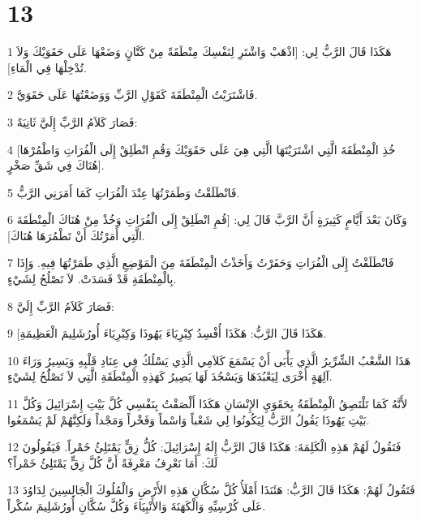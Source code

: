 \chapter{13}

\par 1 هَكَذَا قَالَ الرَّبُّ لِي: [اذْهَبْ وَاشْتَرِ لِنَفْسِكَ مِنْطَقَةً مِنْ كَتَّانٍ وَضَعْهَا عَلَى حَقَوَيْكَ وَلاَ تُدْخِلْهَا فِي الْمَاءِ].
\par 2 فَاشْتَرَيْتُ الْمِنْطَقَةَ كَقَوْلِ الرَّبِّ وَوَضَعْتُهَا عَلَى حَقَوَيَّ.
\par 3 فَصَارَ كَلاَمُ الرَّبِّ إِلَيَّ ثَانِيَةً:
\par 4 [خُذِ الْمِنْطَقَةَ الَّتِي اشْتَرَيْتَهَا الَّتِي هِيَ عَلَى حَقَوَيْكَ وَقُمِ انْطَلِقْ إِلَى الْفُرَاتِ وَاطْمُرْهَا هُنَاكَ فِي شَقِّ صَخْرٍ].
\par 5 فَانْطَلَقْتُ وَطَمَرْتُهَا عِنْدَ الْفُرَاتِ كَمَا أَمَرَنِي الرَّبُّ.
\par 6 وَكَانَ بَعْدَ أَيَّامٍ كَثِيرَةٍ أَنَّ الرَّبَّ قَالَ لِي: [قُمِ انْطَلِقْ إِلَى الْفُرَاتِ وَخُذْ مِنْ هُنَاكَ الْمِنْطَقَةَ الَّتِي أَمَرْتُكَ أَنْ تَطْمُرَهَا هُنَاكَ].
\par 7 فَانْطَلَقْتُ إِلَى الْفُرَاتِ وَحَفَرْتُ وَأَخَذْتُ الْمِنْطَقَةَ مِنَ الْمَوْضِعِ الَّذِي طَمَرْتُهَا فِيهِ. وَإِذَا بِالْمِنْطَقَةِ قَدْ فَسَدَتْ. لاَ تَصْلُحُ لِشَيْءٍ.
\par 8 فَصَارَ كَلاَمُ الرَّبِّ إِلَيَّ:
\par 9 [هَكَذَا قَالَ الرَّبُّ: هَكَذَا أُفْسِدُ كِبْرِيَاءَ يَهُوذَا وَكِبْرِيَاءَ أُورُشَلِيمَ الْعَظِيمَةِ.
\par 10 هَذَا الشَّعْبُ الشِّرِّيرُ الَّذِي يَأْبَى أَنْ يَسْمَعَ كَلاَمِي الَّذِي يَسْلُكُ فِي عِنَادِ قَلْبِهِ وَيَسِيرُ وَرَاءَ آلِهَةٍ أُخْرَى لِيَعْبُدَهَا وَيَسْجُدَ لَهَا يَصِيرُ كَهَذِهِ الْمِنْطَقَةِ الَّتِي لاَ تَصْلَُحُ لِشَيْءٍ.
\par 11 لأَنَّهُ كَمَا تَلْتَصِقُ الْمِنْطَقَةُ بِحَقَوَيِ الإِنْسَانِ هَكَذَا أَلْصَقْتُ بِنَفْسِي كُلَّ بَيْتِ إِسْرَائِيلَ وَكُلَّ بَيْتِ يَهُوذَا يَقُولُ الرَّبُّ لِيَكُونُوا لِي شَعْباً وَاسْماً وَفَخْراً وَمَجْداً وَلَكِنَّهُمْ لَمْ يَسْمَعُوا.
\par 12 فَتَقُولُ لَهُمْ هَذِهِ الْكَلِمَةَ: هَكَذَا قَالَ الرَّبُّ إِلَهُ إِسْرَائِيلَ: كُلُّ زِقٍّ يَمْتَلِئُ خَمْراً. فَيَقُولُونَ لَكَ: أَمَا نَعْرِفُ مَعْرِفَةً أَنَّ كُلَّ زِقٍّ يَمْتَلِئُ خَمْراً؟
\par 13 فَتَقُولُ لَهُمْ: هَكَذَا قَالَ الرَّبُّ: هَئَنَذَا أَمْلَأُ كُلَّ سُكَّانِ هَذِهِ الأَرْضِ وَالْمُلُوكَ الْجَالِسِينَ لِدَاوُدَ عَلَى كُرْسِيِّهِ وَالْكَهَنَةَ وَالأَنْبِيَاءَ وَكُلَّ سُكَّانِ أُورُشَلِيمَ سُكْراً.
